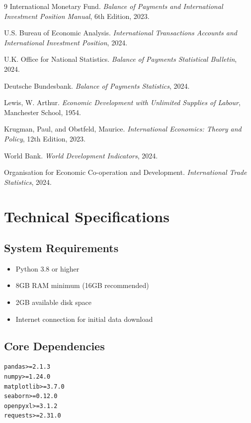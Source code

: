 \documentclass[11pt,a4paper]{article}
\begin{document}
\begin{thebibliography}{9}
 International Monetary Fund. \textit{Balance of Payments and International Investment Position Manual}, 6th Edition, 2023.

 U.S. Bureau of Economic Analysis. \textit{International Transactions Accounts and International Investment Position}, 2024.

 U.K. Office for National Statistics. \textit{Balance of Payments Statistical Bulletin}, 2024.

 Deutsche Bundesbank. \textit{Balance of Payments Statistics}, 2024.

 Lewis, W. Arthur. \textit{Economic Development with Unlimited Supplies of Labour}, Manchester School, 1954.

 Krugman, Paul, and Obstfeld, Maurice. \textit{International Economics: Theory and Policy}, 12th Edition, 2023.

 World Bank. \textit{World Development Indicators}, 2024.

 Organisation for Economic Co-operation and Development. \textit{International Trade Statistics}, 2024.
\end{thebibliography}

\appendix

\section{Technical Specifications}

\subsection{System Requirements}
\begin{itemize}
    \item Python 3.8 or higher
    \item 8GB RAM minimum (16GB recommended)
    \item 2GB available disk space
    \item Internet connection for initial data download
\end{itemize}

\subsection{Core Dependencies}
\begin{verbatim}
pandas>=2.1.3
numpy>=1.24.0
matplotlib>=3.7.0
seaborn>=0.12.0
openpyxl>=3.1.2
requests>=2.31.0
\end{verbatim}
\end{document}
